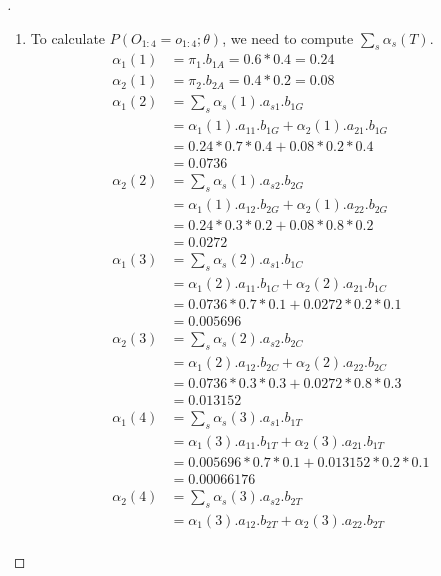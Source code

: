 \documentclass[a4paper, 12pt]{article}
\begin{document}
\begin{proof}[]
\hfill
\begin{enumerate}[label={\color{blue}{\textbf{3.\arabic*})}}]
    \item 
        To calculate $P(O_{1:4}=o_{1:4};\theta)$, we need to compute $\sum_s\alpha_s(T)$. 
        \begin{align*}
            \alpha_1(1) &= \pi_1.b_{1A} = 0.6 * 0.4 = 0.24 \\
            \alpha_2(1) &= \pi_2.b_{2A} = 0.4 * 0.2 = 0.08\\
            \alpha_1(2) &= \sum_s\alpha_s(1).a_{s1}.b_{1G}\\
            &= \alpha_1(1).a_{11}.b_{1G} + \alpha_2(1).a_{21}.b_{1G}\\
            &= 0.24*0.7*0.4 + 0.08*0.2*0.4\\
            &= 0.0736\\
            \alpha_2(2) &= \sum_s\alpha_s(1).a_{s2}.b_{2G}\\
            &= \alpha_1(1).a_{12}.b_{2G} + \alpha_2(1).a_{22}.b_{2G}\\
            &= 0.24*0.3*0.2 + 0.08*0.8*0.2\\
            &= 0.0272\\
            \alpha_1(3) &= \sum_s\alpha_s(2).a_{s1}.b_{1C}\\
            &= \alpha_1(2).a_{11}.b_{1C} + \alpha_2(2).a_{21}.b_{1C}\\
            &= 0.0736*0.7*0.1 + 0.0272*0.2*0.1\\
            &= 0.005696\\
            \alpha_2(3) &= \sum_s\alpha_s(2).a_{s2}.b_{2C}\\
            &= \alpha_1(2).a_{12}.b_{2C} + \alpha_2(2).a_{22}.b_{2C}\\
            &= 0.0736*0.3*0.3 + 0.0272*0.8*0.3\\
            &= 0.013152\\
            \alpha_1(4) &= \sum_s\alpha_s(3).a_{s1}.b_{1T}\\
            &= \alpha_1(3).a_{11}.b_{1T} + \alpha_2(3).a_{21}.b_{1T}\\
            &= 0.005696*0.7*0.1 + 0.013152*0.2*0.1\\
            &= 0.00066176\\
            \alpha_2(4) &= \sum_s\alpha_s(3).a_{s2}.b_{2T}\\
            &= \alpha_1(3).a_{12}.b_{2T} + \alpha_2(3).a_{22}.b_{2T}\\

\end{align*}
\end{enumerate}
\end{proof}
\end{document}
